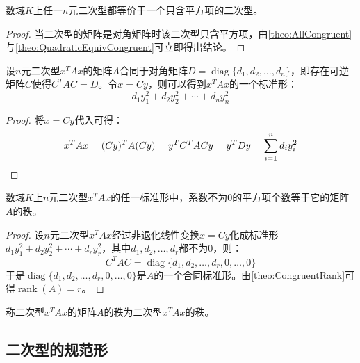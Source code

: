 \begin{theorem}
	数域$K$上任一$n$元二次型都等价于一个只含平方项的二次型。
\end{theorem}
\begin{proof}
	当二次型的矩阵是对角矩阵时该二次型只含平方项，由\cref{theo:AllCongruent}与\cref{theo:QuadraticEquivCongruent}可立即得出结论。
\end{proof}
\begin{theorem}
	设$n$元二次型$x^TAx$的矩阵$A$合同于对角矩阵$D=\operatorname{diag}\{d_1,d_2,\dots,d_n\}$，即存在可逆矩阵$C$使得$C^TAC=D$。令$x=Cy$，则可以得到$x^TAx$的一个标准形：
	\begin{equation*}
		d_1y_1^2+d_2y_2^2+\cdots+d_ny_n^2
	\end{equation*}
\end{theorem}
\begin{proof}
	将$x=Cy$代入可得：
	\begin{equation*}
		x^TAx=(Cy)^TA(Cy)=y^TC^TACy=y^TDy=\sum_{i=1}^{n}d_iy_i^2\qedhere
	\end{equation*}
\end{proof}
\begin{theorem}
	数域$K$上$n$元二次型$x^TAx$的任一标准形中，系数不为$0$的平方项个数等于它的矩阵$A$的秩。
\end{theorem}
\begin{proof}
	设$n$元二次型$x^TAx$经过非退化线性变换$x=Cy$化成标准形$d_1y_1^2+d_2y_2^2+\cdots+d_ry_r^2$，其中$d_1,d_2,\dots,d_r$都不为$0$，则：
	\begin{equation*}
		C^TAC=\operatorname{diag}\{d_1,d_2,\dots,d_r,0,\dots,0\}
	\end{equation*}
	于是$\operatorname{diag}\{d_1,d_2,\dots,d_r,0,\dots,0\}$是$A$的一个合同标准形。由\cref{theo:CongruentRank}可得$\operatorname{rank}(A)=r$。
\end{proof}
\begin{definition}
	称二次型$x^TAx$的矩阵$A$的秩为二次型$x^TAx$的秩。
\end{definition}

\subsection{二次型的规范形}
